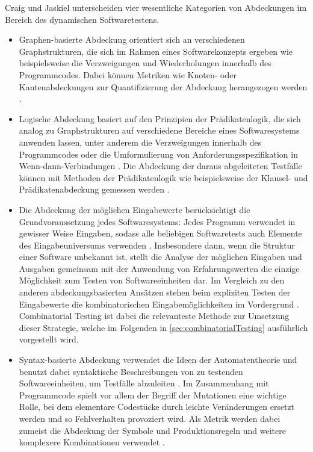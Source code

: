
Craig und Jaskiel \cite{craig2002systematic} unterscheiden vier wesentliche Kategorien von Abdeckungen im Bereich des dynamischen Softwaretestens. 
\begin{itemize}
\item Graphen-basierte Abdeckung orientiert sich an verschiedenen Graphstrukturen, die sich im Rahmen eines Softwarekonzepts ergeben wie beispielsweise die Verzweigungen und Wiederholungen innerhalb des Programmcodes. Dabei können Metriken wie Knoten- oder Kantenabdeckungen zur Quantifizierung der Abdeckung herangezogen werden \cite[S. 27 ff.]{craig2002systematic}.
\item Logische Abdeckung basiert auf den Prinzipien der Prädikatenlogik, die sich analog zu Graphstrukturen auf verschiedene Bereiche eines Softwaresystems anwenden lassen, unter anderem die Verzweigungen innerhalb des Programmcodes oder die Umformulierung von Anforderungsspezifikation in Wenn-dann-Verbindungen \cite[S. 131 ff.]{craig2002systematic}. Die Abdeckung der daraus abgeleiteten Testfälle können mit Methoden der Prädikatenlogik wie beispielsweise der Klausel- und Prädikatenabdeckung gemessen werden \cite[S. 106 ff.]{craig2002systematic}.
\item Die Abdeckung der möglichen Eingabewerte berücksichtigt die Grundvoraussetzung jedes Softwaresystems: Jedes Programm verwendet in gewisser Weise Eingaben, sodass alle beliebigen Softwaretests auch Elemente des Eingabeuniversums verwenden \cite[S. 150]{craig2002systematic}. Insbesondere dann, wenn die Struktur einer Software unbekannt ist, stellt die Analyse der möglichen Eingaben und Ausgaben gemeinsam mit der Anwendung von Erfahrungswerten die einzige Möglichkeit zum Testen von Softwareeinheiten dar. Im Vergleich zu den anderen abdeckungsbasierten Ansätzen stehen beim expliziten Testen der Eingabewerte die kombinatorischen Eingabemöglichkeiten im Vordergrund \cite[S. 150 ff.]{craig2002systematic}. Combinatorial Testing ist dabei die relevanteste Methode zur Umsetzung dieser Strategie, welche im Folgenden in \autoref{sec:combinatorialTesting} ausführlich vorgestellt wird. 
\item Syntax-basierte Abdeckung verwendet die Ideen der Automatentheorie und benutzt dabei syntaktische Beschreibungen von zu testenden Softwareeinheiten, um Testfälle abzuleiten \cite[S. 170 ff.]{craig2002systematic}. Im Zusammenhang mit Programmcode spielt vor allem der Begriff der Mutationen eine wichtige Rolle, bei dem elementare Codestücke durch leichte Veränderungen ersetzt werden und so Fehlverhalten provoziert wird. Als Metrik werden dabei zumeist die Abdeckung der Symbole und Produktionsregeln und weitere komplexere Kombinationen verwendet \cite[S. 172]{craig2002systematic}.
\end{itemize}

